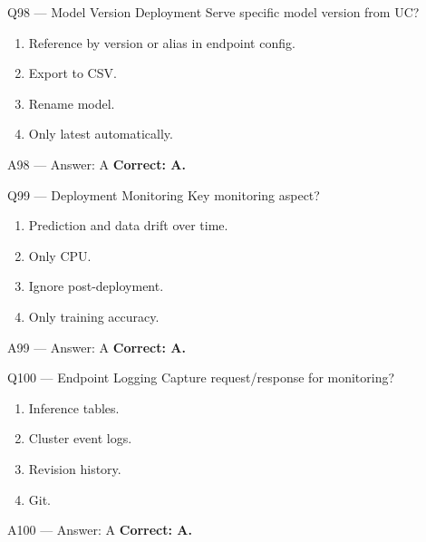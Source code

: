 \documentclass[aspectratio=169,9pt]{beamer}
\begin{document}
	\begin{frame}{Q98 — Model Version Deployment}
		Serve specific model version from UC?
		\begin{enumerate}[label=\Alph*.]
			\item Reference by version or alias in endpoint config.
			\item Export to CSV.
			\item Rename model.
			\item Only latest automatically.
		\end{enumerate}
	\end{frame}
	
	\begin{frame}{A98 — Answer: A}
		\textbf{Correct: A.}
	\end{frame}
	
	\begin{frame}{Q99 — Deployment Monitoring}
		Key monitoring aspect?
		\begin{enumerate}[label=\Alph*.]
			\item Prediction and data drift over time.
			\item Only CPU.
			\item Ignore post-deployment.
			\item Only training accuracy.
		\end{enumerate}
	\end{frame}
	
	\begin{frame}{A99 — Answer: A}
		\textbf{Correct: A.}
	\end{frame}
	
	\begin{frame}{Q100 — Endpoint Logging}
		Capture request/response for monitoring?
		\begin{enumerate}[label=\Alph*.]
			\item Inference tables.
			\item Cluster event logs.
			\item Revision history.
			\item Git.
		\end{enumerate}
	\end{frame}
	
	\begin{frame}{A100 — Answer: A}
		\textbf{Correct: A.}
	\end{frame}
	
\end{document}

